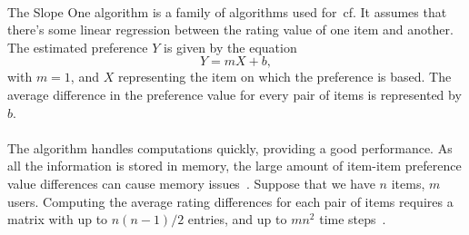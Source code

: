\\
The Slope One algorithm is a family of algorithms used for~\gls{cf}. It assumes that there's some linear regression between the rating value of one item and another. The estimated preference $Y$ is given by the equation
\begin{equation}
Y = mX + b,
\end{equation}
with $m=1$, and $X$ representing the item on which the preference is based. The average difference in the preference value for every pair of items is represented by $b$.\\
\\
The algorithm handles computations quickly, providing a good performance. As all the information is stored in memory, the large amount of item-item preference value differences can cause memory issues~\cite{mahoutInAction}. Suppose that we have $n$ items, $m$ users. Computing the average rating differences for each pair of items requires a matrix with up to $n(n-1)/2$ entries, and up to $mn^2$ time steps~\cite{slopeOneComplexity}.
